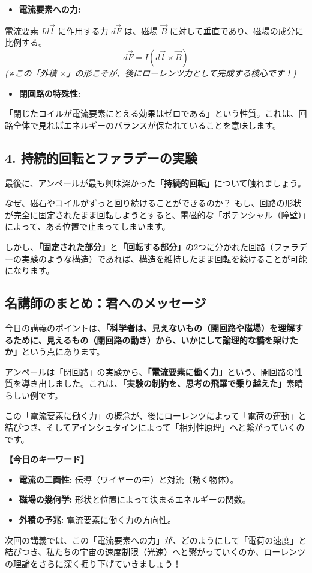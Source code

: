 \documentclass[a4paper,11pt,openany]{ltjsbook}
\begin{document}
\begin{lecturebox}
\begin{itemize}[leftmargin=2em]
\item \textbf{電流要素への力:}
\end{itemize}
    電流要素 $I d\vec{l}$ に作用する力 $d\vec{F}$ は、磁場 $\vec{B}$ に対して垂直であり、磁場の成分に比例する。
    $$d\vec{F} = I (d\vec{l} \times \vec{B})$$
    \textit{(※この「外積 $\times$」の形こそが、後にローレンツ力として完成する核心です！)}

\begin{itemize}[leftmargin=2em]
\item \textbf{閉回路の特殊性:}
\end{itemize}
    「閉じたコイルが電流要素にとえる効果はゼロである」という性質。これは、回路全体で見ればエネルギーのバランスが保たれていることを意味します。

\subsection*{4. 持続的回転とファラデーの実験}

最後に、アンペールが最も興味深かった\textbf{「持続的回転」}について触れましょう。

なぜ、磁石やコイルがずっと回り続けることができるのか？
もし、回路の形状が完全に固定されたまま回転しようとすると、電磁的な「ポテンシャル（障壁）」によって、ある位置で止まってしまいます。

しかし、\textbf{「固定された部分」}と\textbf{「回転する部分」}の2つに分かれた回路（ファラデーの実験のような構造）であれば、構造を維持したまま回転を続けることが可能になります。

\subsection*{ 名講師のまとめ：君へのメッセージ}

今日の講義のポイントは、\textbf{「科学者は、見えないもの（開回路や磁場）を理解するために、見えるもの（閉回路の動き）から、いかにして論理的な橋を架けたか」}という点にあります。

アンペールは「閉回路」の実験から、\textbf{「電流要素に働く力」}という、開回路の性質を導き出しました。これは、\textbf{「実験の制約を、思考の飛躍で乗り越えた」}素晴らしい例です。

この「電流要素に働く力」の概念が、後にローレンツによって「電荷の運動」と結びつき、そしてアインシュタインによって「相対性原理」へと繋がっていくのです。

\textbf{【今日のキーワード】}
\begin{itemize}[leftmargin=2em]
\item \textbf{電流の二面性:} 伝導（ワイヤーの中）と対流（動く物体）。
\item \textbf{磁場の幾何学:} 形状と位置によって決まるエネルギーの関数。
\item \textbf{外積の予兆:} 電流要素に働く力の方向性。
\end{itemize}

次回の講義では、この「電流要素への力」が、どのようにして「電荷の速度」と結びつき、私たちの宇宙の速度制限（光速）へと繋がっていくのか、ローレンツの理論をさらに深く掘り下げていきましょう！
\end{lecturebox}
\end{document}
